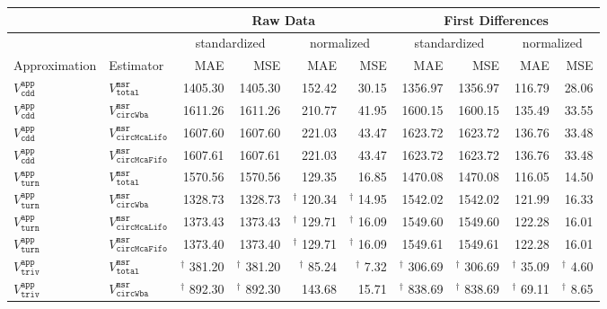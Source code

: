 \begin{tabular}{llrrrrrrrr}
   \hline \multicolumn{2}{l}{ } & \multicolumn{4}{c}{Raw Data} & \multicolumn{4}{c}{First Differences} \\\hline \multicolumn{2}{l}{ } & \multicolumn{2}{c}{standardized} & \multicolumn{2}{c}{normalized} & \multicolumn{2}{c}{standardized} & \multicolumn{2}{c}{normalized} \\ \hline
Approximation & Estimator & MAE & MSE & MAE & MSE & MAE & MSE & MAE & MSE \\ 
   \hline
$V^{\mathtt{app}}_{\mathtt{cdd}}$ & $V^{\mathtt{msr}}_{\mathtt{total}}$ & 1405.30 & 1405.30 & 152.42 & 30.15 & 1356.97 & 1356.97 & 116.79 & 28.06 \\ 
  $V^{\mathtt{app}}_{\mathtt{cdd}}$ & $V^{\mathtt{msr}}_{\mathtt{circWba}}$ & 1611.26 & 1611.26 & 210.77 & 41.95 & 1600.15 & 1600.15 & 135.49 & 33.55 \\ 
  $V^{\mathtt{app}}_{\mathtt{cdd}}$ & $V^{\mathtt{msr}}_{\mathtt{circMcaLifo}}$ & 1607.60 & 1607.60 & 221.03 & 43.47 & 1623.72 & 1623.72 & 136.76 & 33.48 \\ 
  $V^{\mathtt{app}}_{\mathtt{cdd}}$ & $V^{\mathtt{msr}}_{\mathtt{circMcaFifo}}$ & 1607.61 & 1607.61 & 221.03 & 43.47 & 1623.72 & 1623.72 & 136.76 & 33.48 \\ 
   \hline
$V^{\mathtt{app}}_{\mathtt{turn}}$ & $V^{\mathtt{msr}}_{\mathtt{total}}$ & 1570.56 & 1570.56 & 129.35 & 16.85 & 1470.08 & 1470.08 & 116.05 & 14.50 \\ 
  $V^{\mathtt{app}}_{\mathtt{turn}}$ & $V^{\mathtt{msr}}_{\mathtt{circWba}}$ & 1328.73 & 1328.73 &  \(^{\dag}\) 120.34 &  \(^{\dag}\) 14.95 & 1542.02 & 1542.02 & 121.99 & 16.33 \\ 
  $V^{\mathtt{app}}_{\mathtt{turn}}$ & $V^{\mathtt{msr}}_{\mathtt{circMcaLifo}}$ & 1373.43 & 1373.43 &  \(^{\dag}\) 129.71 &  \(^{\dag}\) 16.09 & 1549.60 & 1549.60 & 122.28 & 16.01 \\ 
  $V^{\mathtt{app}}_{\mathtt{turn}}$ & $V^{\mathtt{msr}}_{\mathtt{circMcaFifo}}$ & 1373.40 & 1373.40 &  \(^{\dag}\) 129.71 &  \(^{\dag}\) 16.09 & 1549.61 & 1549.61 & 122.28 & 16.01 \\ 
   \hline
$V^{\mathtt{app}}_{\mathtt{triv}}$ & $V^{\mathtt{msr}}_{\mathtt{total}}$ &  \(^{\dag}\)  381.20 &  \(^{\dag}\)  381.20 &  \(^{\dag}\)  85.24 &  \(^{\dag}\)  7.32 &  \(^{\dag}\)  306.69 &  \(^{\dag}\)  306.69 &  \(^{\dag}\)  35.09 &  \(^{\dag}\)  4.60 \\ 
  $V^{\mathtt{app}}_{\mathtt{triv}}$ & $V^{\mathtt{msr}}_{\mathtt{circWba}}$ &  \(^{\dag}\)  892.30 &  \(^{\dag}\)  892.30 & 143.68 & 15.71 &  \(^{\dag}\)  838.69 &  \(^{\dag}\)  838.69 &  \(^{\dag}\)  69.11 &  \(^{\dag}\)  8.65 \\ 

\end{tabular}
